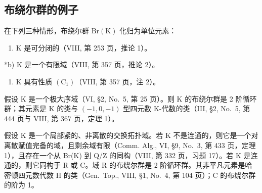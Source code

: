 \subsection{布绕尔群的例子}

在下列三种情形，布绕尔群 \(\mathrm{Br}(\mathrm{K})\) 化归为单位元素：

\begin{enumerate}
\def\labelenumi{\alph{enumi})}
\tightlist
\item
  K 是可分闭的（VIII, 第 253 页，推论 1）。
\end{enumerate}

*b) K 是一个有限域（VIII, 第 357 页，推论 2）。

\begin{enumerate}
\def\labelenumi{\alph{enumi})}
\setcounter{enumi}{2}
\tightlist
\item
  K 具有性质 \((\mathrm{C}_1)\)（VIII, 第 357 页，注 2）。
\end{enumerate}

假设 K 是一个极大序域（VI, §2, No.~5, 第 25 页）。则 K 的布绕尔群是 2 阶循环群；其元素是 K 的类与 \((-1,0,-1)\) 型四元数 K-代数的类（III, §2, No.~5, 第 444 页与 VIII, 第 367 页，定理 1）。

假设 K 是一个局部紧的、非离散的交换拓扑域。若 K 不是连通的，则它是一个对离散赋值完备的域，且剩余域有限（Comm. Alg., VI, §9, No.~3, 第 433 页，定理 1），且存在一个从 Br(K) 到 Q/Z 的同构（VIII, 第 332 页，习题 17）。若 K 是连通的，则它同构于 R 或 C。域 R 的布绕尔群是 2 阶循环群。其非平凡元素是哈密顿四元数代数 H 的类（Gen.~Top., VIII, §1, No.~4, 第 104 页）；C 的布绕尔群的阶为 1。

